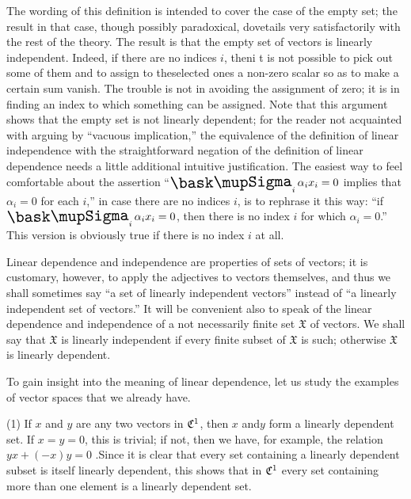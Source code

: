 The wording of this definition is intended to cover the case of the empty set;
the result in that case, though possibly paradoxical, dovetails very
satisfactorily with the rest of the theory. The result is that the empty set of
vectors is linearly independent. Indeed, if there are no indices \(i\), theni t
is not possible to pick out some of them and to assign to theselected ones a
non-zero scalar so as to make a certain sum vanish. The trouble is not in
avoiding the assignment of zero; it is in finding an index to which something
can be assigned. Note that this argument shows that the empty set is not
linearly dependent; for the reader not acquainted with arguing by ``vacuous
implication,'' the equivalence of the definition of linear independence with the
straightforward negation of the definition of linear dependence needs a little
additional intuitive justification. The easiest way to feel comfortable about
the assertion ``\(\sumx_i \alpha_i x_i = 0\) implies that \(\alpha_i = 0\) for
each \(i\),'' in case there are no indices \(i\), is to rephrase it this way:
``if \(\sumx_i \alpha_i x_i = 0\), then there is no index \(i\) for which
\(\alpha_i = 0\).'' This version is obviously true if there is no index \(i\) at
all.

Linear dependence and independence are properties of sets of vectors; it is
customary, however, to apply the adjectives to vectors themselves, and thus we
shall sometimes say ``a set of linearly independent vectors'' instead of ``a
linearly independent set of vectors.'' It will be convenient also to speak of
the linear dependence and independence of a not necessarily finite set
\(\mathfrak{X}\) of vectors. We shall say that \(\mathfrak{X}\) is linearly
independent if every finite subset of \(\mathfrak{X}\) is such; otherwise
\(\mathfrak{X}\) is linearly dependent.

To gain insight into the meaning of linear dependence, let us study the examples
of vector spaces that we already have.

(1) If \(x\) and \(y\) are any two vectors in \(\mathfrak{C}^1\), then \(x\)
and\(y\) form a linearly dependent set. If \(x =y = 0\), this is trivial; if
not, then we have, for example, the relation \(yx + (-x)y = 0\) .Since it is
clear that every set containing a linearly dependent subset is itself linearly
dependent, this shows that in \(\mathfrak{C}^1\) every set containing more than
one element is a linearly dependent set.

